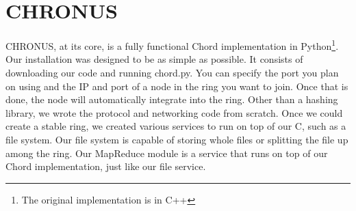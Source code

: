 \documentclass[conference, compsocconf, letterpaper]{IEEEtran}
\begin{document}





\section{CHRONUS}


CHRONUS, at its core, is a fully functional Chord implementation in Python\footnote{The original implementation is in C++}.  Our installation was designed to be as simple as possible.   It consists of downloading our code\cite{code} and running chord.py.  You can specify the port you plan on using and the IP and port of a node in the ring you want to join.  Once that is done, the node will automatically integrate into the ring.
Other than a hashing library, we wrote the protocol and networking code from scratch.  Once we could create a stable ring, we created various services to run on top of our C, such as a file system.  Our file system is capable of storing whole files or splitting the file up among the ring. Our MapReduce module is a service that runs on top of our Chord implementation, just like our file service.  
\end{document}
